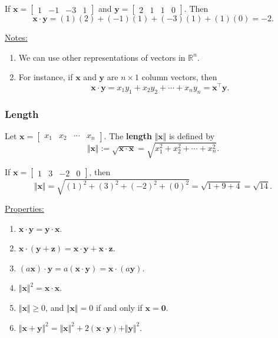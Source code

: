 \documentclass[20pt,a4paper]{extarticle}
\newcounter{example}
\newcounter{definition}
\begin{document}
\begin{example}
If $\mathbf{x} = \begin{bmatrix} 1 & -1 & -3 & 1 \end{bmatrix}$ and $\mathbf{y} = \begin{bmatrix} 2 & 1 & 1 & 0 \end{bmatrix}$. Then
	\[
		\mathbf{x} \cdot \mathbf{y} = (1)(2) + (-1)(1) + (-3)(1) + (1) (0) = - 2.
	\]
\end{example}

\underline{Notes:}
	\begin{enumerate}[label=\Circled{\arabic*}]
		\item We can use other representations of vectors in $\mathbb{R}^n$.
		\item For instance, if $\mathbf{x}$ and $\mathbf{y}$ are $n \times 1$ column vectors, then
			\[
				\mathbf{x} \cdot \mathbf{y} = x_1 y_1 + x_2 y_2 + \cdots + x_n y_n = \mathbf{x}^\top \mathbf{y} .
			\]
	\end{enumerate}

\newpage 

\subsubsection{Length}

\begin{definition}
Let $\mathbf{x} = \begin{bmatrix} x_1 & x_2 & \cdots & x_n \end{bmatrix}$. The \textbf{length} $\Vert \mathbf{x} \Vert$ is defined by
	\[
		\Vert \mathbf{x} \Vert := \sqrt{\mathbf{x} \cdot \mathbf{x}} = \sqrt{x_1^2 + x_2^2 + \cdots + x_n^2} .
	\]
\end{definition}

\begin{example}
If $\mathbf{x} = \begin{bmatrix} 1 & 3 & -2 & 0 \end{bmatrix}$, then
	\[
		\Vert \mathbf{x} \Vert = \sqrt{(1)^2 + (3)^2 + (-2)^2 + (0)^2} = \sqrt{1 + 9 + 4} = \sqrt{14} .
	\]
\end{example}

\underline{Properties:}
	\begin{enumerate}[label=\Circled{\arabic*}]
		\item $\mathbf{x} \cdot \mathbf{y} = \mathbf{y} \cdot \mathbf{x}$.
		\item $\mathbf{x} \cdot (\mathbf{y} + \mathbf{z} ) = \mathbf{x} \cdot \mathbf{y} + \mathbf{x} \cdot \mathbf{z}$.
		\item $(a \mathbf{x}) \cdot \mathbf{y} = a (\mathbf{x} \cdot \mathbf{y} ) = \mathbf{x} \cdot (a \mathbf{y} )$.
		\item $\Vert \mathbf{x} \Vert^2 = \mathbf{x} \cdot \mathbf{x}$.
		\item $\Vert \mathbf{x} \Vert \geq 0$, and $\Vert \mathbf{x} \Vert = 0$ if and only if $\mathbf{x} = \mathbf{0}$.
		\item $\Vert \mathbf{x} + \mathbf{y} \Vert^2 = \Vert \mathbf{x} \Vert^2 + 2 (\mathbf{x} \cdot \mathbf{y}) + \Vert \mathbf{y} \Vert^2$.
	\end{enumerate}
\end{document}

